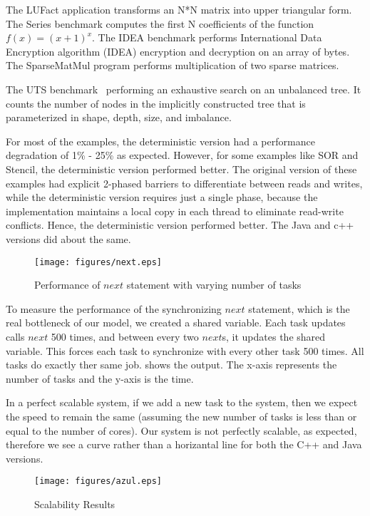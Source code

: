\documentclass[10pt, conference, compsocconf]{IEEEtran}
\begin{document}
The LUFact application transforms an N*N matrix into upper triangular form. The Series benchmark
computes the first N coefficients of the function $f(x) = (x+1)^x$. The IDEA benchmark
performs International Data Encryption algorithm  (IDEA) encryption and decryption on an array
of bytes.
The SparseMatMul program performs multiplication of two sparse matrices.


The UTS  benchmark~\cite{olivier2006uts}
performing an exhaustive search on an unbalanced tree.
It  counts the number of
nodes in  the implicitly constructed tree that is parameterized in
 shape, depth, size, and imbalance.

For most of the examples, the deterministic version had a performance degradation
of 1\% - 25\% as expected. However, for some examples like SOR and Stencil, the deterministic
version performed better. The original version of these examples had explicit 2-phased 
barriers to differentiate between reads and writes, while the deterministic
version requires just a single phase, because the implementation maintains
 a local copy in each thread
to eliminate read-write conflicts. Hence, the deterministic
version performed better. The Java and c++ versions did about the same.

\begin{figure}[htbp]
\texttt{[image: figures/next.eps]}
\caption{Performance of $next$ statement with varying number of tasks}
\label{fig:next}
\end{figure}


To measure the performance of the synchronizing $next$ statement, which
is the real bottleneck of our model, we created a shared variable.
Each task updates calls $next$ 500 times, and between every two $next$s, it
updates the shared variable. This  forces
each task to synchronize with every other task 500 times.
All tasks do exactly ther same job.  shows the output.
The x-axis represents the number of tasks and the y-axis is the time.

In a perfect scalable system, if we add a new task to the system, then we 
expect the  speed to remain the same (assuming the new number of tasks is less 
than or equal to the number of cores). Our system is not perfectly scalable,
as expected, therefore we see a curve rather than a horizantal line for both
the C++ and Java versions.



\begin{figure*}[htbp]
\texttt{[image: figures/azul.eps]}
\caption{Scalability Results}
\label{fig:azul}
\end{figure*}
\end{document}
